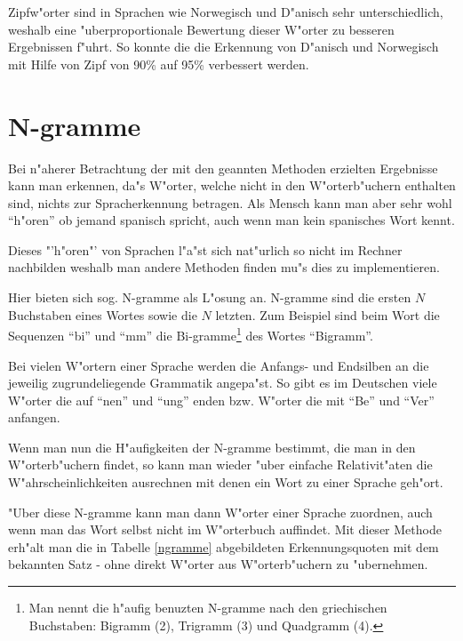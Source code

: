 Zipfw"orter sind in Sprachen wie Norwegisch und D"anisch sehr unterschiedlich, weshalb eine "uberproportionale Bewertung dieser W"orter zu besseren Ergebnissen f"uhrt. So konnte die die Erkennung von D"anisch und Norwegisch mit Hilfe von Zipf von 90\% auf 95\% verbessert werden.


\section{N-gramme}

Bei n"aherer Betrachtung der mit den geannten Methoden erzielten Ergebnisse kann man erkennen, da"s W"orter, welche nicht in den W"orterb"uchern enthalten sind, nichts zur Spracherkennung betragen. Als Mensch kann man aber sehr wohl "`h"oren"' ob jemand spanisch spricht, auch wenn man kein spanisches Wort kennt.

Dieses "'h"oren"' von Sprachen l"a"st sich nat"urlich so nicht im Rechner nachbilden weshalb man andere Methoden finden mu"s dies zu implementieren.

Hier bieten sich sog. N-gramme als L"osung an. N-gramme sind die ersten $N$ Buchstaben eines Wortes sowie die $N$ letzten. Zum Beispiel sind beim Wort die Sequenzen "`bi"' und "`mm"' die Bi-gramme\footnote{Man nennt die h"aufig benuzten N-gramme nach den griechischen Buchstaben: Bigramm (2), Trigramm (3) und Quadgramm (4).} des Wortes "`Bigramm"'.

Bei vielen W"ortern einer Sprache werden die Anfangs- und Endsilben an die jeweilig zugrundeliegende Grammatik angepa"st. So gibt es im Deutschen viele W"orter die auf "`nen"' und "`ung"' enden bzw. W"orter die mit "`Be"' und "`Ver"' anfangen.

Wenn man nun die H"aufigkeiten der N-gramme bestimmt, die man in den W"orterb"uchern findet, so kann man wieder "uber einfache Relativit"aten die W"ahrscheinlichkeiten ausrechnen mit denen ein Wort zu einer Sprache geh"ort.

"Uber diese N-gramme kann man dann W"orter einer Sprache zuordnen, auch wenn man das Wort selbst nicht im W"orterbuch auffindet. Mit dieser Methode erh"alt man die in Tabelle \ref{ngramme} abgebildeten Erkennungsquoten mit dem bekannten Satz - ohne direkt W"orter aus W"orterb"uchern zu "ubernehmen.


